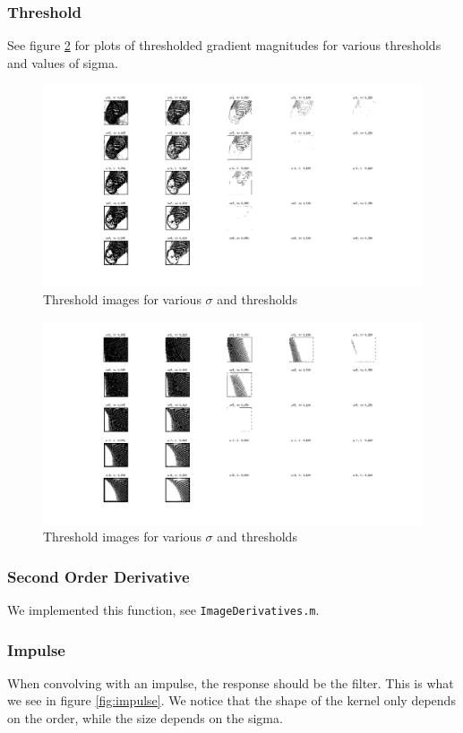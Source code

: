 \documentclass[a4paper,10pt]{article}
\begin{document}
\subsubsection{Threshold}
See figure \ref{fig:pn1thresh} for plots of thresholded gradient magnitudes for various thresholds and values of sigma.
\begin{figure}[ht]
\centering
\includegraphics[width=\textwidth]{zebra_img/threshold}
\caption{Threshold images for various $\sigma$ and thresholds}
\label{fig:zebrathresh}
\end{figure}
\begin{figure}[ht]
\centering
\includegraphics[width=\textwidth]{pn1_img/threshold}
\caption{Threshold images for various $\sigma$ and thresholds}
\label{fig:pn1thresh}
\end{figure}

\subsubsection{Second Order Derivative}
We implemented this function, see \verb+ImageDerivatives.m+.


\subsubsection{Impulse}
When convolving with an impulse, the response should be the filter.
This is what we see in figure \ref{fig:impulse}.
We notice that the shape of the kernel only depends on the order, while the size depends on the sigma.
\end{document}

